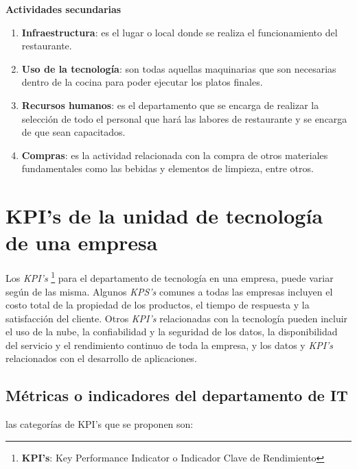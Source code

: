 \documentclass[12pt]{article}
\begin{document}
  \textbf{Actividades secundarias}\\
  \begin{enumerate}
    \item \textbf{Infraestructura}: es el lugar o local donde se realiza el funcionamiento del restaurante.
    
    \item \textbf{Uso de la tecnología}: son todas aquellas maquinarias que son necesarias
    dentro de la cocina para poder ejecutar los platos finales.

    \item \textbf{Recursos humanos}: es el departamento que se encarga de realizar la
    selección de todo el personal que hará las labores de restaurante y se encarga de que
    sean capacitados.
    
    \item \textbf{Compras}: es la actividad relacionada con la compra de otros materiales
    fundamentales como las bebidas y elementos de limpieza, entre otros.
  \end{enumerate}

\section{KPI's de la unidad de tecnología de una empresa}
Los \textit{KPI's} \footnote{\textbf{KPI's}: Key Performance Indicator o Indicador Clave de Rendimiento} para el 
departamento de tecnología en una empresa, puede variar según de las misma. Algunos \textit{KPS's} comunes a todas
las empresas incluyen el costo total de la propiedad de los productos, el tiempo de respuesta y la satisfacción del
cliente. Otros \textit{KPI's} relacionadas con la tecnología pueden incluir el uso de la nube, la confiabilidad y 
la seguridad de los datos, la disponibilidad del servicio y el rendimiento continuo de toda la empresa, y los datos
y \textit{KPI's} relacionados con el desarrollo de aplicaciones.\\


\subsection{Métricas o indicadores del departamento de IT}

las categorías de KPI's que se proponen son:
\end{document}
